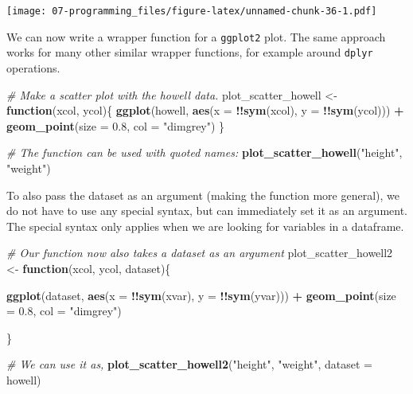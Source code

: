 \documentclass[]{book}
\newenvironment{Shaded}{\begin{snugshade}}{\end{snugshade}}
\newcommand{\CommentTok}[1]{\textcolor[rgb]{0.56,0.35,0.01}{\textit{#1}}}
\newcommand{\ControlFlowTok}[1]{\textcolor[rgb]{0.13,0.29,0.53}{\textbf{#1}}}
\newcommand{\DataTypeTok}[1]{\textcolor[rgb]{0.13,0.29,0.53}{#1}}
\newcommand{\FloatTok}[1]{\textcolor[rgb]{0.00,0.00,0.81}{#1}}
\newcommand{\KeywordTok}[1]{\textcolor[rgb]{0.13,0.29,0.53}{\textbf{#1}}}
\newcommand{\NormalTok}[1]{#1}
\newcommand{\OperatorTok}[1]{\textcolor[rgb]{0.81,0.36,0.00}{\textbf{#1}}}
\newcommand{\StringTok}[1]{\textcolor[rgb]{0.31,0.60,0.02}{#1}}
\begin{document}
\texttt{[image: 07-programming\_files/figure-latex/unnamed-chunk-36-1.pdf]}

We can now write a wrapper function for a \texttt{ggplot2} plot. The same approach works for many other similar wrapper functions, for example around \texttt{dplyr} operations.

\begin{Shaded}
\begin{Highlighting}[]
\CommentTok{# Make a scatter plot with the howell data.}
\NormalTok{plot_scatter_howell <-}\StringTok{ }\ControlFlowTok{function}\NormalTok{(xcol, ycol)\{}
    \KeywordTok{ggplot}\NormalTok{(howell, }\KeywordTok{aes}\NormalTok{(}\DataTypeTok{x =} \OperatorTok{!!}\KeywordTok{sym}\NormalTok{(xcol), }\DataTypeTok{y =} \OperatorTok{!!}\KeywordTok{sym}\NormalTok{(ycol))) }\OperatorTok{+}
\StringTok{    }\KeywordTok{geom_point}\NormalTok{(}\DataTypeTok{size =} \FloatTok{0.8}\NormalTok{, }\DataTypeTok{col =} \StringTok{"dimgrey"}\NormalTok{)}
\NormalTok{\}}

\CommentTok{# The function can be used with quoted names:}
\KeywordTok{plot_scatter_howell}\NormalTok{(}\StringTok{"height"}\NormalTok{, }\StringTok{"weight"}\NormalTok{)}
\end{Highlighting}
\end{Shaded}

To also pass the dataset as an argument (making the function more general), we do not have to use any special syntax, but can immediately set it as an argument. The special syntax only applies when we are looking for variables in a dataframe.

\begin{Shaded}
\begin{Highlighting}[]
\CommentTok{# Our function now also takes a dataset as an argument}
\NormalTok{plot_scatter_howell2 <-}\StringTok{ }\ControlFlowTok{function}\NormalTok{(xcol, ycol, dataset)\{}
  
  \KeywordTok{ggplot}\NormalTok{(dataset, }\KeywordTok{aes}\NormalTok{(}\DataTypeTok{x =} \OperatorTok{!!}\KeywordTok{sym}\NormalTok{(xvar), }\DataTypeTok{y =} \OperatorTok{!!}\KeywordTok{sym}\NormalTok{(yvar))) }\OperatorTok{+}
\StringTok{  }\KeywordTok{geom_point}\NormalTok{(}\DataTypeTok{size =} \FloatTok{0.8}\NormalTok{, }\DataTypeTok{col =} \StringTok{"dimgrey"}\NormalTok{)}
  
\NormalTok{\}}

\CommentTok{# We can use it as,}
\KeywordTok{plot_scatter_howell2}\NormalTok{(}\StringTok{"height"}\NormalTok{, }\StringTok{"weight"}\NormalTok{, }\DataTypeTok{dataset =}\NormalTok{ howell)}
\end{Highlighting}
\end{Shaded}
\end{document}
